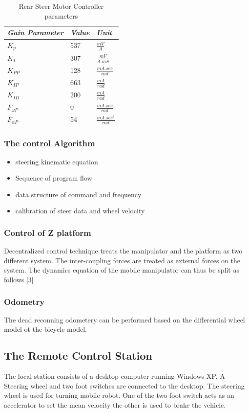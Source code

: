 \begin{table}[!htbp]
	\caption{ Rear Steer Motor Controller  parameters }
	\label{tb:steer}
	\centering
	\begin{tabular}{l l l}
		\hline
		\emph{Gain Parameter}  & \emph{ Value} & \emph{Unit} \\
		\hline
		$K_p$  & 537 &  $\frac{mV}{A}$ \\ 
		$K_I $ & 307 & $\frac{mV}{A.mS}$ \\
		$K_{PP}$& 128 & $ \frac{mA.sec}{rad}$\\
		$K_{IP}$&663&$\frac{mA}{rad}$\\
		$K_{ID}$&200&$\frac{mA}{rad}$\\
		$F_{\omega P}$& 0& $ \frac{mA.sec}{rad}$\\
		$F_{\alpha P}$& 54& $ \frac{mA.sec^2}{rad}$\\
		\hline
	\end{tabular}
\end{table}
\subsubsection{The control Algorithm}
\begin{itemize}
\item steering kinematic equation
\item Sequence of program flow
\item data structure of command  and  frequency
\item calibration of steer data and wheel velocity
\end{itemize}
\subsubsection{Control of Z platform}
Decentralized control technique treats the manipulator and the platform as two different system. The inter-coupling forces are treated as external forces on the system. The dynamics equation of the mobile manipulator can thus be split as follows [3]
\subsubsection{Odometry }
The dead reconning odometery can be performed based on the differential wheel model ot the bicycle model.
\subsection{The Remote Control Station}   
The local station consists of a desktop computer running Windows XP. A Steering wheel and two foot switches are connected to the desktop. The steering wheel is used for turning  mobile robot. One of the two foot switch acts as an accelerator to set the mean velocity the other  is used to brake the vehicle.

